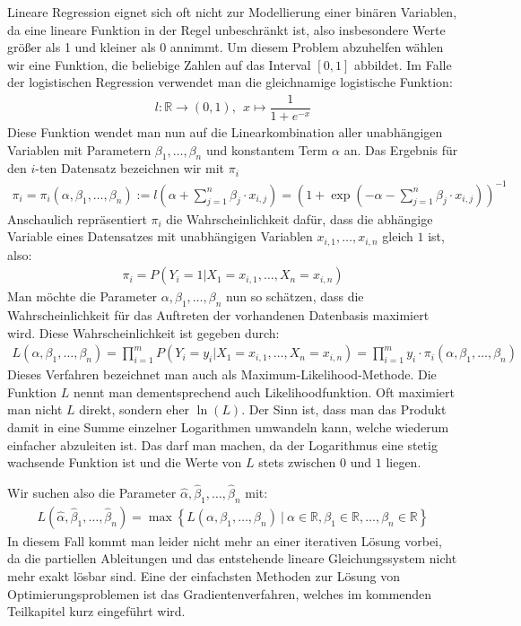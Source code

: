 Lineare Regression eignet sich oft nicht zur Modellierung einer binären Variablen, da eine lineare Funktion in der Regel unbeschränkt ist, also insbesondere Werte größer als 1 und kleiner als 0 annimmt. Um diesem Problem abzuhelfen wählen wir eine Funktion, die beliebige Zahlen auf das Interval $[0, 1]$ abbildet. Im Falle der logistischen Regression verwendet man die gleichnamige logistische Funktion:
\begin{align*}
    l: \mathbb{R} \rightarrow (0, 1),~~ x \mapsto \dfrac{1}{1+e^{-x}}
\end{align*}
Diese Funktion wendet man nun auf die Linearkombination aller unabhängigen Variablen mit Parametern $\beta_1, \dots, \beta_n$ und konstantem Term $\alpha$ an. Das Ergebnis für den $i$-ten Datensatz bezeichnen wir mit $\pi_i$
\begin{align*}
    \pi_i = \pi_i(\alpha, \beta_1, \dots, \beta_n) := l \left( \alpha + \sum_{j=1}^n \beta_j \cdot x_{i, j} \right) = \left( 1 + \exp \left( - \alpha - \sum_{j=1}^n \beta_j \cdot x_{i, j} \right) \right)^{-1}
\end{align*}
Anschaulich repräsentiert $\pi_i$ die Wahrscheinlichkeit dafür, dass die abhängige Variable eines Datensatzes mit unabhängigen Variablen $x_{i, 1}, \dots, x_{i, n}$ gleich $1$ ist, also:
\begin{align*}
    \pi_i = P(Y_i = 1 | X_1 = x_{i, 1}, \dots, X_n = x_{i, n})
\end{align*}
Man möchte die Parameter $\alpha, \beta_1, \dots, \beta_n$ nun so schätzen, dass die Wahrscheinlichkeit für das Auftreten der vorhandenen Datenbasis maximiert wird. Diese Wahrscheinlichkeit ist gegeben durch:
\begin{align*}
    L(\alpha, \beta_1, \dots, \beta_n) = \prod_{i=1}^m P(Y_i = y_i | X_1 = x_{i, 1}, \dots, X_n = x_{i, n}) = \prod_{i=1}^m y_i \cdot \pi_i(\alpha, \beta_1, \dots, \beta_n)
\end{align*}
Dieses Verfahren bezeichnet man auch als Maximum-Likelihood-Methode. Die Funktion $L$ nennt man dementsprechend auch Likelihoodfunktion. Oft maximiert man nicht $L$ direkt, sondern eher $\ln(L)$. Der Sinn ist, dass man das Produkt damit in eine Summe einzelner Logarithmen umwandeln kann, welche wiederum einfacher abzuleiten ist. Das darf man machen, da der Logarithmus eine stetig wachsende Funktion ist und die Werte von $L$ stets zwischen $0$ und $1$ liegen.

Wir suchen also die Parameter $\hat\alpha, \hat\beta_1, \dots, \hat\beta_n$ mit:
\begin{align*}
    L(\hat\alpha, \hat\beta_1, \dots, \hat\beta_n) = \max \left\{ L(\alpha, \beta_1, \dots, \beta_n) ~|~ \alpha \in \mathbb{R}, \beta_1 \in \mathbb{R}, \dots, \beta_n \in \mathbb{R} \right\}
\end{align*}
In diesem Fall kommt man leider nicht mehr an einer iterativen Lösung vorbei, da die partiellen Ableitungen und das entstehende lineare Gleichungssystem nicht mehr exakt lösbar sind. Eine der einfachsten Methoden zur Lösung von Optimierungsproblemen ist das Gradientenverfahren, welches im kommenden Teilkapitel kurz eingeführt wird.
